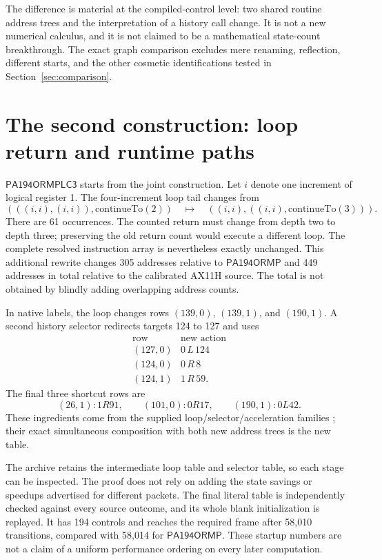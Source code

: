 \documentclass[11pt,a4paper]{article}
\newcommand{\Mone}{\mathsf{PA194ORMP}}
\newcommand{\Mtwo}{\mathsf{PA194ORMPLC3}}
\begin{document}
The difference is material at the compiled-control level: two shared
routine address trees and the interpretation of a history call change.
It is not a new numerical calculus, and it is not claimed to be a
mathematical state-count breakthrough. The exact graph comparison excludes
mere renaming, reflection, different starts, and the other cosmetic
identifications tested in Section~\ref{sec:comparison}.

\section{The second construction: loop return and runtime paths}
\label{sec:second}

$\Mtwo$ starts from the joint construction. Let $i$ denote one increment
of logical register 1. The four-increment loop tail changes from
\[
 (((i,i),(i,i)),\mathrm{continueTo}(2))
 \quad\longmapsto\quad
 ((i,i),((i,i),\mathrm{continueTo}(3))).
\]
There are 61 occurrences. The counted return must change from depth two to
depth three; preserving the old return count would execute a different
loop. The complete resolved instruction array is nevertheless exactly
unchanged. This additional rewrite changes 305 addresses relative to
$\Mone$ and 449 addresses in total relative to the calibrated AX11H source.
The total is not obtained by blindly adding overlapping address counts.

In native labels, the loop changes rows $(139,0)$, $(139,1)$, and $(190,1)$.
A second history selector redirects targets 124 to 127 and uses
\[
\begin{array}{c|c}
\text{row}&\text{new action}\\ \hline
(127,0)&0\,L\,124\\
(124,0)&0\,R\,8\\
(124,1)&1\,R\,59.
\end{array}
\]
The final three shortcut rows are
\[
 (26,1):1R91,\qquad (101,0):0R17,\qquad (190,1):0L42.
\]
These ingredients come from the supplied loop/selector/acceleration
families \cite{loopreturn,mpincoming}; their exact simultaneous
composition with both new address trees is the new table.

The archive retains the intermediate loop table and selector table, so
each stage can be inspected. The proof does not rely on adding the state
savings or speedups advertised for different packets. The final literal
table is independently checked against every source outcome, and its whole
blank initialization is replayed. It has 194 controls and reaches the
required frame after 58,010 transitions, compared with 58,014 for $\Mone$.
These startup numbers are not a claim of a uniform performance ordering
on every later computation.
\end{document}
